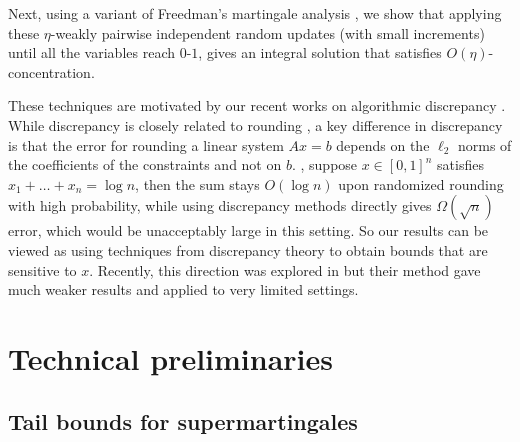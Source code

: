 \documentclass{toc}
\begin{document}
Next, using a variant of Freedman's martingale analysis \cite{Freedman}, we show that applying these $\eta$-weakly pairwise independent random
updates (with small increments) until all the variables reach $0$-$1$, gives an integral solution that satisfies $O(\eta)$-concentration.

These techniques are motivated by our recent works
on algorithmic discrepancy \cite{BDG16, BG17}.
While discrepancy is closely related to rounding
\cite{LSV86, R12}, a key difference in discrepancy is that the error for
rounding a linear system $Ax=b$ depends on the $\ell_2$ norms of the coefficients of the constraints and not
on $b$. \Eg, suppose $x \in [0,1]^n$ satisfies  $x_1 + \ldots + x_n = \log n$, then the sum stays
$O(\log n)$ upon randomized rounding with high probability, while
using discrepancy methods directly gives $\Omega(\sqrt{n})$ error, which would be unacceptably large in this setting. So our results can be
viewed as using techniques from discrepancy theory %
to obtain bounds that are sensitive to $x$.
Recently, this direction was explored in \cite{BN16}
but their method gave much weaker results and applied to very limited settings.

\section{Technical preliminaries}
\label{s:prel}
\subsection{Tail bounds for supermartingales}
%
%
%
%
%
%
%
%

%
%
%
%

%
%
%
%
%
%

%
%
\end{document}

